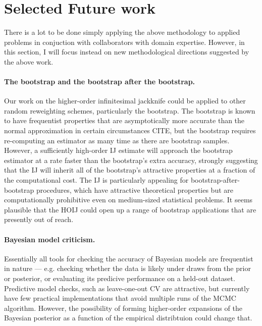 \section{Selected Future work}

There is a lot to be done simply applying the above methodology to
applied problems in conjuction with collaborators with domain expertise.
However, in this section, I will focus instead on new methodological directions
suggested by the above work.

\paragraph{The bootstrap and the bootstrap after the bootstrap.}

Our work on the higher-order infinitesimal jackknife could be applied to other
random reweighting schemes, particularly the bootstrap.  The bootstrap is known
to have frequentist properties that are asymptotically more accurate than the
normal approximation in certain circumstances CITE, but the bootstrap requires
re-computing an estimator as many time as there are bootstrap samples. However,
a sufficiently high-order IJ estimate will approach the bootstrap estimator at a
rate faster than the bootstrap's extra accuracy, strongly suggesting that the IJ
will inherit all of the bootstrap's attractive properties at a fraction of the
computational cost.  The IJ is particularly appealing for
bootstrap-after-bootstrap procedures, which have attractive theoretical
properties but are computationally prohibitive even on medium-sized statistical
problems.  It seems plausible that the HOIJ could open up a range of bootstrap
applications that are presently out of reach.


\paragraph{Bayesian model criticism.}

Essentially all tools for checking the accuracy of Bayesian models are
frequentist in nature --- e.g. checking whether the data is likely under
draws from the prior or posterior, or evaluating its predicive performance
on a held-out dataset.  Predictive model checks, such as leave-one-out
CV are attractive, but currently have few practical implementations that
avoid multiple runs of the MCMC algorithm.  However, the possibility of
forming higher-order expansions of the Bayesian posterior as a function of
the empirical distribtuion could change that.


